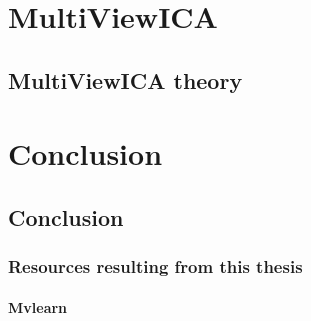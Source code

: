 \documentclass[ twoside,openright,titlepage,numbers=noenddot,%
                headinclude,footinclude,cleardoublepage=empty,abstract=on,
                BCOR=5mm,paper=a4,fontsize=11pt, 
                ]{scrreprt}
\begin{document}
\part{MultiViewICA}
\chapter{MultiViewICA theory}

% 
% 
% 
% 
% 

\part{Conclusion}
\chapter{Conclusion}
\section{Resources resulting from this thesis}
\subsection{Mvlearn}
\end{document}
